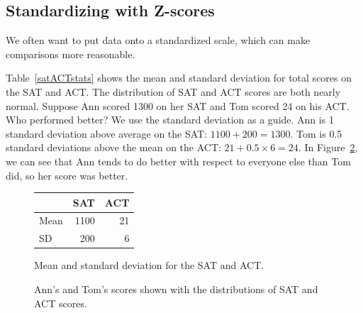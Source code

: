 \subsection{Standardizing with Z-scores}

\noindent%
We often want to put data onto a standardized scale,
which can make comparisons more reasonable.

\newcommand{\satmean}{1100}
\newcommand{\satsd}{200}
\newcommand{\actmean}{21}
\newcommand{\actsd}{6}
\newcommand{\annsatscore}{1300}
\newcommand{\annsatzscore}{1}
\newcommand{\tomsatscore}{24}
\newcommand{\tomsatzscore}{0.5}

\begin{examplewrap}
\begin{nexample}{Table~\vref{satACTstats} shows the mean
    and standard deviation for total scores on the SAT and ACT.
    The distribution of SAT and ACT scores are both nearly normal.
    Suppose Ann scored \annsatscore{} on her SAT and Tom scored
    \tomsatscore{} on his ACT.
    Who performed better?}
  \label{actSAT}%
  We use the standard deviation as a guide.
  Ann is \annsatzscore{} standard deviation above average
  on the SAT: $\satmean{} + \satsd{} = \annsatscore{}$.
  Tom is \tomsatzscore{} standard deviations above the mean
  on the ACT:
  $\actmean{} + \tomsatzscore{} \times \actsd{} = \tomsatscore{}$.
  In Figure~\ref{satActNormals}, we can see that Ann tends
  to do better with respect to everyone else than Tom did,
  so her score was better.
\end{nexample}
\end{examplewrap}

\begin{figure}[h]
\centering
\begin{tabular}{l r r}
  \hline
  & SAT & ACT \\
  \hline
  Mean \hspace{0.3cm} & \satmean{} & \actmean{} \\
  SD & \satsd{} & \actsd{} \\
  \hline
\end{tabular}
\caption{Mean and standard deviation for the SAT and ACT.}
\label{satACTstats}
\end{figure}

\begin{figure}
  \centering
  \caption{Ann's and Tom's scores shown with the distributions
      of SAT and ACT scores.}
  \label{satActNormals}
\end{figure}

